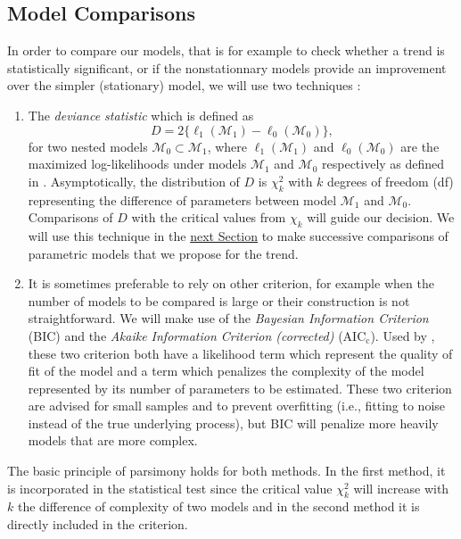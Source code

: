 \subsection{Model Comparisons}

In order to compare our models, that is for example to check whether a trend is statistically significant, or if the nonstationnary models provide an improvement over the simpler (stationary) model, we will use two techniques :

\begin{enumerate}
	\item The \emph{deviance statistic} which is defined as 
	\begin{equation}
	D = 2\big\{\ell_1(\mathcal{M}_1)-\ell_0(\mathcal{M}_0)\big\},
	\end{equation}
	for two nested models $\mathcal{M}_0\subset \mathcal{M}_1$, where $\ell_1(\mathcal{M}_1)$ and $\ell_0(\mathcal{M}_0)$ are the maximized log-likelihoods under models $\mathcal{M}_1$ and $\mathcal{M}_0$ respectively as defined in .
	Asymptotically, the distribution of $D$ is $\chi^2_k$ with $k$ degrees of freedom (df) representing the difference of parameters between model $\mathcal{M}_1$ and $\mathcal{M}_0$. Comparisons of $D$ with the critical values from $\chi_k$ will guide our decision.
	We will use this technique in the \hyperref[sec:comp0]{next Section} to make successive comparisons of parametric models that we propose for the trend.  
	
	\item It is sometimes preferable to rely on other criterion, for example when the number of models to be compared is large or their construction is not straightforward. We will make use of the \emph{Bayesian Information Criterion} (BIC) and  the \emph{Akaike Information Criterion (corrected) } ($\text{AIC}_{\text{c}}$). Used by \citet{cannon_flexible_2010}, these two criterion both have a likelihood term which represent the quality of fit of the model and a term which penalizes the complexity of the model represented by its number of parameters to be estimated. These two criterion are advised for small samples and to prevent overfitting (i.e., fitting to noise instead of the true underlying process), but BIC will penalize more heavily models that are more complex.
	
\end{enumerate}
The basic principle of parsimony holds for both methods. In the first method, it is incorporated in the statistical test since the critical value $\chi^2_k$ will increase with $k$ the difference of complexity of two models and in the second method it is directly included in the criterion.

